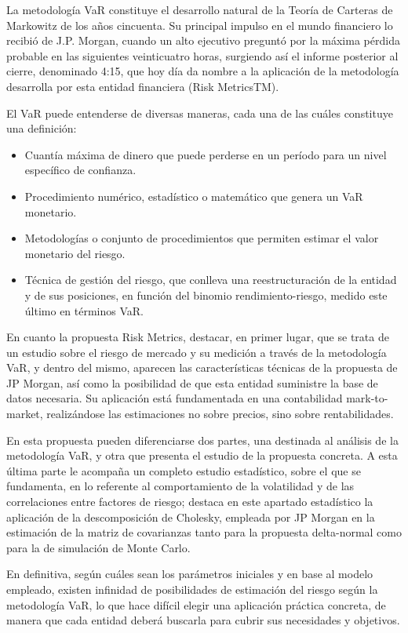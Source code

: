 \documentclass[
  12pt,
]{krantz}
\providecommand{\tightlist}{%
  \setlength{\itemsep}{0pt}\setlength{\parskip}{0pt}}
\begin{document}
La metodología VaR constituye el desarrollo natural de la Teoría de Carteras de Markowitz de los años cincuenta. Su principal impulso en el mundo financiero lo recibió de J.P. Morgan, cuando un alto ejecutivo preguntó por la máxima pérdida probable en las siguientes veinticuatro horas, surgiendo así el informe posterior al cierre, denominado 4:15, que hoy día da nombre a la aplicación de la metodología desarrolla por esta entidad financiera (Risk MetricsTM).

El VaR puede entenderse de diversas maneras, cada una de las cuáles constituye una definición:

\begin{itemize}
\tightlist
\item
  Cuantía máxima de dinero que puede perderse en un período para un nivel específico de confianza.
\item
  Procedimiento numérico, estadístico o matemático que genera un VaR monetario.
\item
  Metodologías o conjunto de procedimientos que permiten estimar el valor monetario del riesgo.
\item
  Técnica de gestión del riesgo, que conlleva una reestructuración de la entidad y de sus posiciones, en función del binomio rendimiento-riesgo, medido este último en términos VaR.
\end{itemize}

En cuanto la propuesta Risk Metrics, destacar, en primer lugar, que se trata de un estudio sobre el riesgo de mercado y su medición a través de la metodología VaR, y dentro del mismo, aparecen las características técnicas de la propuesta de JP Morgan, así como la posibilidad de que esta entidad suministre la base de datos necesaria. Su aplicación está fundamentada en una contabilidad mark-to-market, realizándose las estimaciones no sobre precios, sino sobre rentabilidades.

En esta propuesta pueden diferenciarse dos partes, una destinada al análisis de la metodología VaR, y otra que presenta el estudio de la propuesta concreta. A esta última parte le acompaña un completo estudio estadístico, sobre el que se fundamenta, en lo referente al comportamiento de la volatilidad y de las correlaciones entre factores de riesgo; destaca en este apartado estadístico la aplicación de la descomposición de Cholesky, empleada por JP Morgan en la estimación de la matriz de covarianzas tanto para la propuesta delta-normal como para la de simulación de Monte Carlo.

En definitiva, según cuáles sean los parámetros iniciales y en base al modelo empleado, existen infinidad de posibilidades de estimación del riesgo según la metodología VaR, lo que hace difícil elegir una aplicación práctica concreta, de manera que cada entidad deberá buscarla para cubrir sus necesidades y objetivos.
\end{document}
